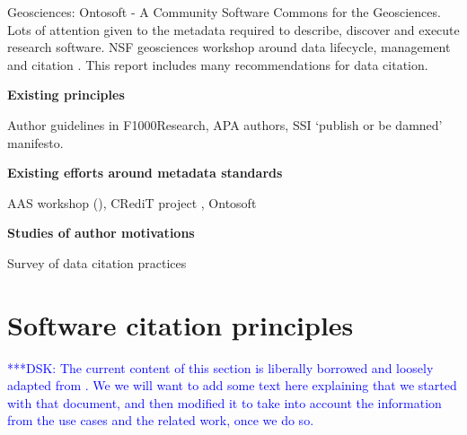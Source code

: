 \documentclass[11pt, oneside]{amsart}
\newcommand{\katznote}[1]{ {\textcolor{blue} { ***DSK: #1 }}}
\begin{document}
Geosciences: Ontosoft \cite{ontosoft} - A Community Software Commons for the Geosciences. Lots of attention given to the metadata
required to describe, discover and execute research software. NSF geosciences workshop around data lifecycle, management and citation \cite{nsf-geo-data}. This report includes many recommendations for data citation.

\textbf{Existing principles}

Author guidelines in F1000Research, APA authors, SSI `publish or be damned' \cite{ssi-publish-or-be-damned} manifesto.

\textbf{Existing efforts around metadata standards}

AAS workshop (\cite{aas-software-index}), CRediT project \cite{casrai-credit}, Ontosoft \cite{ontosoft}

\textbf{Studies of author motivations}

Survey of data citation practices \cite{Kratz_2015}

\section{Software citation principles}
\label{sec:principles}

\katznote{The current content of this section is liberally borrowed and loosely adapted from \cite{data-citation-principles}.  We we will want to add some text here explaining that we started with that document, and then modified it to take into account the information from the use cases and the related work, once we do so.}
\end{document}
